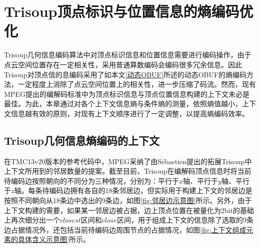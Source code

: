 \documentclass[bachelor,print,msfonts]{xduthesis}
\begin{document}
\mainmatter
\fi

\chapter{Trisoup顶点标识与位置信息的熵编码优化}
\label{cha:options}
Trisoup几何信息编码算法中对顶点标识信息和位置信息需要进行编码操作，由于点云空间位置存在一定相关性，采用普通算数编码会编码很多冗余信息。因此Trisoup对顶点信的息编码采用了如本文\ref{动态OBUF}所述的动态OBUF的熵编码方法，一定程度上消除了点云空间位置上的相关性，进一步压缩了码流。然而，现有MPEG提出的编解码标准中为顶点标识信息与顶点位置信息构建的上下文未必是最佳。为此，本章通过对各个上下文信息熵与条件熵的测量，依照熵值越小，上下文信息越有效的原则，对现有上下文顺序进行了一定调整，以提高熵编码效率。
\section{Trisoup几何信息熵编码的上下文}
在TMC13v20版本的参考代码中，MPEG采纳了由Sébastien提出的拓展Trisoup中上下文所用到的邻居数量的提案。截至目前，Trisoup在编解码顶点信息时将当前待编码边按照朝向的不同分为三种情况，分别为：平行于$x$轴、平行于$y$轴、平行于$z$轴。每条待编码边拥有各自的18条邻居边，但实际用于构建上下文的邻居边是按照不同朝向从18条边中选出的9条边，如图\ref{fig:邻居边示意图}所示。另外，由于上下文构建的需要，如果某一邻居边被占据，边上顶点位置在被量化为2bit的基础上再次细分出一个$closest$区间和$close$区间，用于组成上下文的信息除了选取的9条边占据情况外，还包括当前待编码边周围节点的占据情况，如图\ref{fig:上下文组成元素的具体含义示意图}所示。
\end{document}
